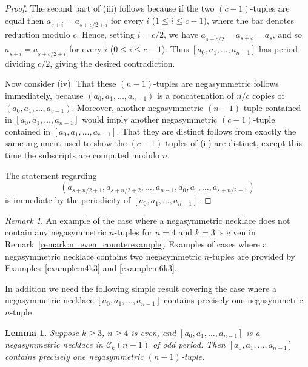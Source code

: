\documentclass[a4paper,11pt]{article}
\theoremstyle{plain}
\newtheorem{lemma}{Lemma}[section]
\theoremstyle{definition}
\theoremstyle{remark}
\newtheorem{remark}{Remark}[section]
\begin{document}
\begin{proof}
The second part of (iii) follows because if the two $(c-1)$-tuples are equal then
$a_{\overline{s+i}}=a_{\overline{s+c/2+i}}$ for every $i$ ($1\leq i\leq c-1$), where the bar
denotes reduction modulo $c$. Hence, setting $i=c/2$, we have
$a_{\overline{s+c/2}}=a_{\overline{s+c}}=a_{\overline{s}}$, and so
$a_{\overline{s+i}}=a_{\overline{s+c/2+i}}$ for every $i$ ($0\leq i\leq c-1$). Thus
$[a_0,a_1,\dots,a_{n-1}]$ has period dividing $c/2$, giving the desired contradiction.



Now consider (iv). That these $(n-1)$-tuples are negasymmetric follows immediately, because
$(a_0,a_1,\dots,a_{n-1})$ is a concatenation of $n/c$ copies of $(a_0,a_1,\dots,a_{c-1})$.
Moreover, another negasymmetric $(n-1)$-tuple contained in $[a_0,a_1,\dots,a_{n-1}]$ would imply
another negasymmetric $(c-1)$-tuple contained in $[a_0,a_1,\dots,a_{c-1}]$. That they
are distinct follows from exactly the same argument used to show the $(c-1)$-tuples of (ii) are
distinct, except this time the subscripts are computed modulo $n$.

The statement regarding
\[ (a_{s+n/2+1},a_{s+n/2+2},\dots,a_{n-1},a_0,a_1,\dots,a_{s+n/2-1}) \]
is immediate by the periodicity of $[a_0,a_1,\dots,a_{n-1}]$.
\end{proof}

\begin{remark}
An example of the case where a negasymmetric necklace does not contain any negasymmetric $n$-tuples
for $n=4$ and $k=3$ is given in Remark~\ref{remark:n_even_counterexample}. Examples of cases where
a negasymmetric necklace contains two negasymmetric $n$-tuples are provided by
Examples~\ref{example:n4k3} and \ref{example:n6k3}.
\end{remark}



In addition we need the following simple result covering the case where a negasymmetric necklace
$[a_0,a_1,\dots,a_{n-1}]$ contains precisely one negasymmetric $n$-tuple

\begin{lemma}  \label{lemma:exactly_one_nega_n-1-tuple_when_odd_period}
Suppose $k\geq 3$, $n\geq 4$ is even, and $[a_0,a_1,\dots,a_{n-1}]$ is a negasymmetric necklace in
$\mathcal{C}_k(n-1)$ of odd period.  Then $[a_0,a_1,\dots,a_{n-1}]$ contains precisely one
negasymmetric $(n-1)$-tuple.
\end{lemma}
\end{document}
